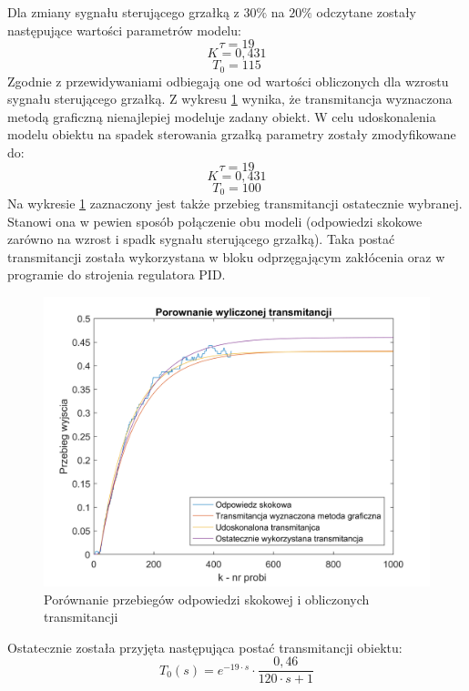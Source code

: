 \documentclass[12pt, a4paper]{article}
\begin{document}
Dla zmiany sygnału sterującego grzałką z $30\%$ na $20\%$ odczytane zostały następujące wartości parametrów modelu:
\[\tau=19\]
\[K=0,431\]
\[T_{0}=115\]
Zgodnie z przewidywaniami odbiegają one od wartości obliczonych dla wzrostu sygnału sterującego grzałką. Z wykresu \ref{fig:transmi_gd} wynika, że transmitancja wyznaczona metodą graficzną nienajlepiej modeluje zadany obiekt. W celu udoskonalenia modelu obiektu na spadek sterowania grzałką parametry zostały zmodyfikowane do:
\[\tau=19\]
\[K=0,431\]
\[T_{0}=100\]
Na wykresie \ref{fig:transmi_gd} zaznaczony jest także przebieg transmitancji ostatecznie wybranej. Stanowi ona w pewien sposób połączenie obu modeli (odpowiedzi skokowe zarówno na wzrost i spadk sygnału sterującego grzałką). Taka postać transmitancji została wykorzystana w bloku odprzęgającym zakłócenia oraz w programie do strojenia regulatora PID.
\begin{figure}[H]
	\centering
	\includegraphics[width=0.9\linewidth]{transmi_gd}
	\caption{Porównanie przebiegów odpowiedzi skokowej i obliczonych transmitancji}
	\label{fig:transmi_gd}
\end{figure}
Ostatecznie została przyjęta następująca postać transmitancji obiektu:
\[T_{0}(s)=e^{-19 \cdot s} \cdot \frac{0,46}{120 \cdot s +1}\]
\end{document}
